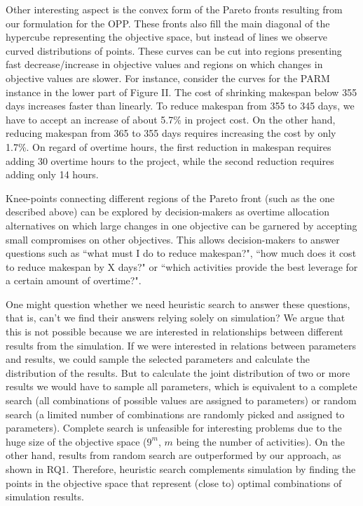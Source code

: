 \documentclass[conference]{IEEEtran}
\begin{document}
Other interesting aspect is the convex form of the Pareto fronts resulting from our formulation for the OPP. These fronts also fill the main diagonal of the hypercube representing the objective space, but instead of lines we observe curved distributions of points. These curves can be cut into regions presenting fast decrease/increase in objective values and regions on which changes in objective values are slower. For instance, consider the curves for the PARM instance in the lower part of Figure II. The cost of shrinking makespan below 355 days increases faster than linearly. To reduce makespan from 355 to 345 days, we have to accept an increase of about 5.7\% in project cost. On the other hand, reducing makespan from 365 to 355 days requires increasing the cost by only 1.7\%. On regard of overtime hours, the first reduction in makespan requires adding 30 overtime hours to the project, while the second reduction requires adding only 14 hours. 

Knee-points connecting different regions of the Pareto front (such as the one described above) can be explored by decision-makers as overtime allocation alternatives on which large changes in one objective can be garnered by accepting small compromises on other objectives. This allows decision-makers to answer questions such as ``what must I do to reduce makespan?", ``how much does it cost to reduce makespan by X days?" or ``which activities provide the best leverage for a certain amount of overtime?".

One might question whether we need heuristic search to answer these questions, that is, can't we find their answers relying solely on simulation? We argue that this is not possible because we are interested in relationships between different results from the simulation. If we were interested in relations between parameters and results, we could sample the selected parameters and calculate the distribution of the results. But to calculate the joint distribution of two or more results we would have to sample all parameters, which is equivalent to a complete search (all combinations of possible values are assigned to parameters) or random search (a limited number of combinations are randomly picked and assigned to parameters). Complete search is unfeasible for interesting problems due to the huge size of the objective space ($9^m$, $m$ being the number of activities). On the other hand, results from random search are outperformed by our approach, as shown in RQ1. Therefore, heuristic search complements simulation by finding the points in the objective space that represent (close to) optimal combinations of simulation results.
\end{document}
